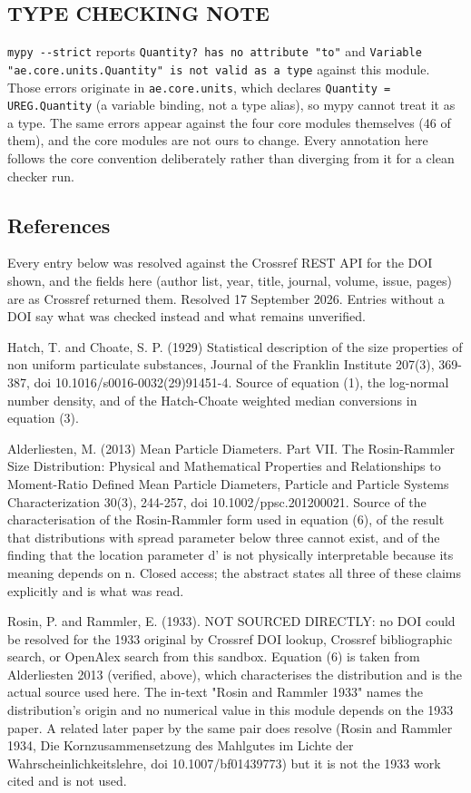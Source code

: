 \documentclass[10pt,a4paper,twoside]{report}
\begin{document}
\subsection*{TYPE CHECKING NOTE}

\texttt{mypy -{}-strict} reports \texttt{Quantity? has no attribute "to"} and \texttt{Variable "ae.core.units.Quantity" is not valid as a type} against this module. Those errors originate in \texttt{ae.core.units}, which declares \texttt{Quantity = UREG.Quantity} (a variable binding, not a type alias), so mypy cannot treat it as a type. The same errors appear against the four core modules themselves (46 of them), and the core modules are not ours to change. Every annotation here follows the core convention deliberately rather than diverging from it for a clean checker run.

\subsection*{References}

Every entry below was resolved against the Crossref REST API for the DOI shown, and the fields here (author list, year, title, journal, volume, issue, pages) are as Crossref returned them. Resolved 17 September 2026. Entries without a DOI say what was checked instead and what remains unverified.

Hatch, T. and Choate, S. P. (1929) Statistical description of the size properties of non uniform particulate substances, Journal of the Franklin Institute 207(3), 369-387, doi 10.1016/s0016-0032(29)91451-4. Source of equation (1), the log-normal number density, and of the Hatch-Choate weighted median conversions in equation (3).

Alderliesten, M. (2013) Mean Particle Diameters. Part VII. The Rosin-Rammler Size Distribution: Physical and Mathematical Properties and Relationships to Moment-Ratio Defined Mean Particle Diameters, Particle and Particle Systems Characterization 30(3), 244-257, doi 10.1002/ppsc.201200021. Source of the characterisation of the Rosin-Rammler form used in equation (6), of the result that distributions with spread parameter below three cannot exist, and of the finding that the location parameter d' is not physically interpretable because its meaning depends on n. Closed access; the abstract states all three of these claims explicitly and is what was read.

Rosin, P. and Rammler, E. (1933). NOT SOURCED DIRECTLY: no DOI could be resolved for the 1933 original by Crossref DOI lookup, Crossref bibliographic search, or OpenAlex search from this sandbox. Equation (6) is taken from Alderliesten 2013 (verified, above), which characterises the distribution and is the actual source used here. The in-text "Rosin and Rammler 1933" names the distribution's origin and no numerical value in this module depends on the 1933 paper. A related later paper by the same pair does resolve (Rosin and Rammler 1934, Die Kornzusammensetzung des Mahlgutes im Lichte der Wahrscheinlichkeitslehre, doi 10.1007/bf01439773) but it is not the 1933 work cited and is not used.
\end{document}
